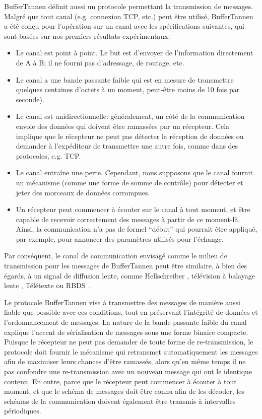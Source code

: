 BufferTannen définit aussi un protocole permettant la transmission de messages. Malgré que tout canal (e.g. connexion TCP, etc.) peut être utilisé, BufferTannen a été conçu pour l'opération sur un canal avec les spécifications suivantes, qui sont basées sur nos premiers résultats expérimentaux:

\begin{itemize}
\item Le canal est point à point. Le but est d'envoyer de l'information directement de A à B; il ne fourni pas d'adressage, de routage, etc.
\item Le canal a une bande passante faible qui est en mesure de transmettre quelques centaines d'octets à un moment, peut-être moins de 10 fois par seconde).
\item Le canal est unidirectionnelle: généralement, un côté de la communication envoie des données qui doivent être ramassées par un récepteur. Cela implique que le récepteur ne peut pas détecter la réception de données ou demander à l'expéditeur de transmettre une autre fois, comme dans des protocoles, e.g. TCP.
\item Le canal entraîne une perte. Cependant, nous supposons que le canal fournit un mécanisme (comme une forme de somme de contrôle) pour détecter et jeter des morceaux de données corrompues.
\item Un récepteur peut commencer à écouter sur le canal à tout moment, et être capable de recevoir correctement des messages à partir de ce moment-là. Ainsi, la communication n'a pas de formel ``début'' qui pourrait être appliqué, par exemple, pour annoncer des paramètres utilisés pour l'échange.
\end{itemize}

Par conséquent, le canal de communication envisagé comme le milieu de transmission pour les messages de BufferTannen peut être similaire, à bien des égards, à un signal de diffusion lente, comme Hellschreiber \citep{hells}, télévision à balayage lente \citep{slowtv}, Télétexte \citep{teletext} ou RBDS~\citep{rbds}.

Le protocole BufferTannen vise à transmettre des messages de manière aussi fiable que possible avec ces conditions, tout en préservant l'intégrité de données et l'ordonnancement de messages. La nature de la bande passante faible du canal explique l'accent de sérialisation de messages sous une forme binaire compacte. Puisque le récepteur ne peut pas demander de toute forme de re-transmission, le protocole doit fournir le mécanisme qui retransmet automatiquement les messages afin de maximiser leurs chances d'être ramassés, alors qu'en même temps il ne pas confondre une re-transmission avec un nouveau message qui ont le identique contenu. En outre, parce que le récepteur peut commencer à écouter à tout moment, et que le schéma de messages doit être connu afin de les décoder, les schémas de la communication doivent également être transmis à intervalles périodiques.

